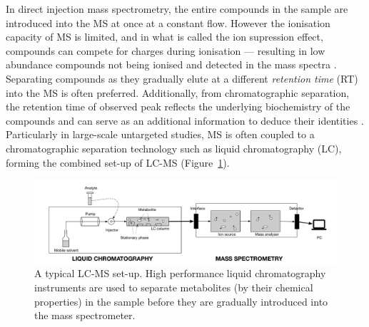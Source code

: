 In direct injection mass spectrometry, the entire compounds in the sample are introduced into the MS at once at a constant flow. However the ionisation capacity of MS is limited, and in what is called the ion supression effect, compounds can compete for charges during ionisation --- resulting in low abundance compounds not being ionised and detected in the mass spectra \cite{Smith2014}. Separating compounds as they gradually elute at a different \emph{retention time} (RT) into the MS is often preferred. Additionally, from chromatographic separation, the retention time of observed peak reflects the underlying biochemistry of the compounds and can serve as an additional information to deduce their identities \cite{Cao2015}. Particularly in large-scale untargeted studies, MS is often coupled to a chromatographic separation technology such as liquid chromatography (LC), forming the combined set-up of LC-MS (Figure~\ref{fig:LC-MS-setup}). 

\begin{figure}
\noindent \begin{centering}
\includegraphics[width=1.0\textwidth]{02-background/figures/LCMS}
\par\end{centering}
\caption{\label{fig:LC-MS-setup}A typical LC-MS set-up. High performance liquid chromatography instruments are used to separate metabolites (by their chemical properties) in the sample before they are gradually introduced into the mass spectrometer.}
\end{figure}

